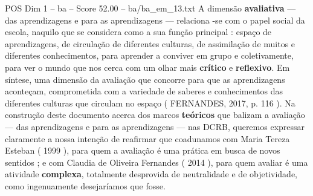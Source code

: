 \begin{textsample}{POS Dim 1 – ba – Score 52.00 – ba/ba\_em\_13.txt}
A dimensão \textbf{avaliativa} — das aprendizagens e para as aprendizagens — relaciona -se com o papel social da escola, naquilo que se considera como a sua função principal : espaço de aprendizagens, de circulação de diferentes culturas, de assimilação de muitos e diferentes conhecimentos, para aprender a conviver em grupo e coletivamente, para ver o mundo que nos cerca com um olhar mais \textbf{crítico} e \textbf{reflexivo}.
Em síntese, uma dimensão da avaliação que concorre para que as aprendizagens aconteçam, comprometida com a variedade de saberes e conhecimentos das diferentes culturas que circulam no espaço ( FERNANDES, 2017, p. 116 ).
Na construção deste documento acerca dos marcos \textbf{teóricos} que balizam a avaliação — das aprendizagens e para as aprendizagens — nas DCRB, queremos expressar claramente a nossa intenção de reafirmar que coadunamos com Maria Tereza Esteban ( 1999 ), para quem a avaliação é uma prática em busca de novos sentidos ; e com Claudia de Oliveira Fernandes ( 2014 ), para quem avaliar é uma atividade \textbf{complexa}, totalmente desprovida de neutralidade e de objetividade, como ingenuamente desejaríamos que fosse.

\end{textsample}
